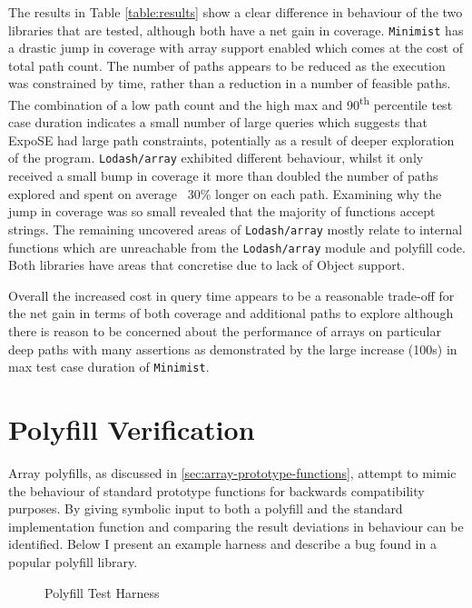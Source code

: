 \documentclass[]{final_report}
\begin{document}
The results in Table \ref{table:results} show a clear difference in behaviour of the two libraries that are tested, although both have a net gain in coverage. \lstinline|Minimist| has a drastic jump in coverage with array support enabled which comes at the cost of total path count. The number of paths appears to be reduced as the execution was constrained by time, rather than a reduction in a number of feasible paths. The combination of a low path count and the high max and 90\textsuperscript{th} percentile test case duration indicates a small number of large queries which suggests that ExpoSE had large path constraints, potentially as a result of deeper exploration of the program. \lstinline|Lodash/array| exhibited different behaviour, whilst it only received a small bump in coverage it more than doubled the number of paths explored and spent on average ~30\% longer on each path. Examining why the jump in coverage was so small revealed that the majority of functions accept strings. The remaining uncovered areas of \lstinline|Lodash/array| mostly relate to internal functions which are unreachable from the \lstinline|Lodash/array| module and polyfill code. Both libraries have areas that concretise due to lack of Object support.

Overall the increased cost in query time appears to be a reasonable trade-off for the net gain in terms of both coverage and additional paths to explore although there is reason to be concerned about the performance of arrays on particular deep paths with many assertions as demonstrated by the large increase (100s) in max test case duration of \lstinline|Minimist|.

\section{Polyfill Verification}
Array polyfills, as discussed in \ref{sec:array-prototype-functions}, attempt to mimic the behaviour of standard prototype functions for backwards compatibility purposes. By giving symbolic input to both a polyfill and the standard implementation function and comparing the result deviations in behaviour can be identified. Below I present an example harness and describe a bug found in a popular polyfill library.

\begin{figure}[t]

\caption{\label{fig:polyfill-test-harness} Polyfill Test Harness}
\end{figure}
\end{document}
